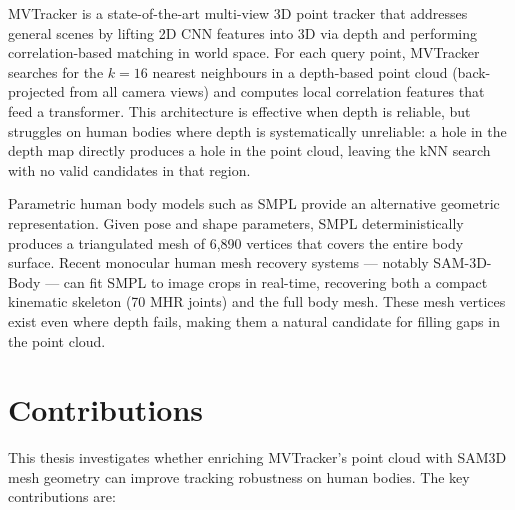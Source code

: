 \documentclass[12pt, a4paper, oneside]{report}
\begin{document}
MVTracker \cite{rajic2025multiview3dpointtracking} is a state-of-the-art multi-view 3D point tracker that addresses general scenes by lifting 2D CNN features into 3D via depth and performing correlation-based matching in world space. For each query point, MVTracker searches for the $k=16$ nearest neighbours in a depth-based point cloud (back-projected from all camera views) and computes local correlation features that feed a transformer. This architecture is effective when depth is reliable, but struggles on human bodies where depth is systematically unreliable: a hole in the depth map directly produces a hole in the point cloud, leaving the kNN search with no valid candidates in that region.

Parametric human body models such as SMPL \cite{loper2015smpl} provide an alternative geometric representation. Given pose and shape parameters, SMPL deterministically produces a triangulated mesh of 6,890 vertices that covers the entire body surface. Recent monocular human mesh recovery systems --- notably SAM-3D-Body \cite{sam3dteam2025sam3d3dfyimages} --- can fit SMPL to image crops in real-time, recovering both a compact kinematic skeleton (70 MHR joints) and the full body mesh. These mesh vertices exist even where depth fails, making them a natural candidate for filling gaps in the point cloud.

\section{Contributions}
This thesis investigates whether enriching MVTracker's point cloud with SAM3D mesh geometry can improve tracking robustness on human bodies. The key contributions are:
\end{document}
